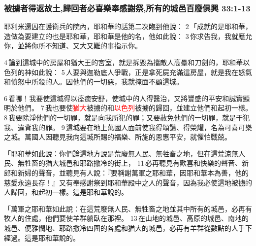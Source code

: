 \subsubsection{被擄者得返故土,歸回者必喜樂奉感謝祭,所有的城邑百廢俱興 33:1-13}
耶利米還囚在護衛兵的院內，耶和華的話第二次臨到他說： 2 「成就的是耶和華，造做為要建立的也是耶和華，耶和華是他的名，他如此說： 3 你求告我，我就應允你，並將你所不知道、又大又難的事指示你。 

4 論到這城中的房屋和猶大王的宮室，就是拆毀為擋敵人高壘和刀劍的，耶和華以色列的神如此說： 5 人要與迦勒底人爭戰，正是拿死屍充滿這房屋，就是我在怒氣和憤怒中所殺的人。因他們的一切惡，我就掩面不顧這城。

 6 看哪！我要使這城得以痊癒安舒，使城中的人得醫治，又將豐盛的平安和誠實顯明於他們。 7 我也要使\textcolor{red}{猶大}被擄的和\textcolor{red}{以色列}被擄的歸回，並建立他們和起初一樣。 8 我要除淨他們的一切罪，就是向我所犯的罪；又要赦免他們的一切罪，就是干犯我、違背我的罪。 9 這城要在地上萬國人面前使我得頌讚、得榮耀，名為可喜可樂之城。萬國人因聽見我向這城所賜的福樂、所施的恩惠平安，就懼怕戰兢。

「耶和華如此說：你們論這地方說是荒廢無人民、無牲畜之地，但在這荒涼無人民、無牲畜的猶大城邑和耶路撒冷的街上， 11 必再聽見有歡喜和快樂的聲音、新郎和新婦的聲音，並聽見有人說：『要稱謝萬軍之耶和華，因耶和華本為善，他的慈愛永遠長存！』又有奉感謝祭到耶和華殿中之人的聲音，因為我必使這地被擄的人歸回，和起初一樣。這是耶和華說的。

「萬軍之耶和華如此說：在這荒廢無人民、無牲畜之地並其中所有的城邑，必再有牧人的住處，他們要使羊群躺臥在那裡。 13 在山地的城邑、高原的城邑、南地的城邑、便雅憫地、耶路撒冷四圍的各處和猶大的城邑，必再有羊群從數點的人手下經過。這是耶和華說的。

